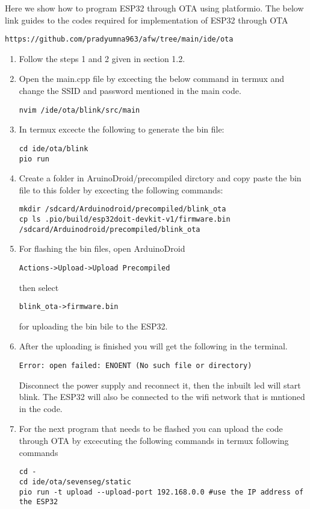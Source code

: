 Here we show how to program ESP32 through OTA using platformio.
The below link guides to the codes required for implementation of ESP32 through OTA  
\begin{lstlisting}
https://github.com/pradyumna963/afw/tree/main/ide/ota
\end{lstlisting}
\begin{enumerate}[label=\arabic*.,ref=\theenumi]
\item Follow the steps 1 and 2 given in section 1.2.
\item Open the main.cpp file by excecting the below command in termux and change the SSID and password mentioned in the main code.
\begin{lstlisting}
nvim /ide/ota/blink/src/main
\end{lstlisting}
\item In termux excecte the following to generate the bin file:
\begin{lstlisting}
cd ide/ota/blink
pio run
\end{lstlisting}
\item Create a folder in AruinoDroid/precompiled dirctory and copy paste the bin file to this folder by excecting the following commands:
\begin{lstlisting}
mkdir /sdcard/Arduinodroid/precompiled/blink_ota
cp ls .pio/build/esp32doit-devkit-v1/firmware.bin /sdcard/Arduinodroid/precompiled/blink_ota
\end{lstlisting}
\item For flashing the bin files, open ArduinoDroid
\begin{lstlisting}
Actions->Upload->Upload Precompiled
\end{lstlisting}
then select 
\begin{lstlisting}
blink_ota->firmware.bin
\end{lstlisting}
for uploading the bin bile to the ESP32.
\item After the uploading is finished you will get the following in the terminal.
\begin{lstlisting}
Error: open failed: ENOENT (No such file or directory)
\end{lstlisting} 
Disconnect the power supply and reconnect it, then the inbuilt led will start blink. The ESP32 will also be connected to the wifi network that is mntioned in the code.
\item For the next program that needs to be flashed you can upload the code through OTA by excecuting the following commands in termux following commands
\begin{lstlisting}
cd -
cd ide/ota/sevenseg/static
pio run -t upload --upload-port 192.168.0.0 #use the IP address of the ESP32
\end{lstlisting}
\end{enumerate}

